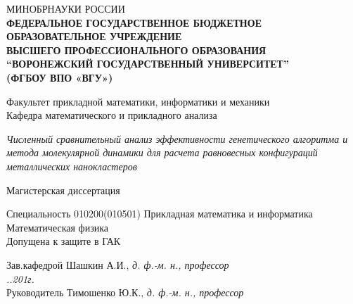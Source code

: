 %
%
\begin{titlepage}

\thispagestyle{empty} %
\begin{center}
 МИНОБРНАУКИ РОССИИ \\
{\bf {\small ФЕДЕРАЛЬНОЕ ГОСУДАРСТВЕННОЕ БЮДЖЕТНОЕ ОБРАЗОВАТЕЛЬНОЕ УЧРЕЖДЕНИЕ \\
ВЫСШЕГО ПРОФЕССИОНАЛЬНОГО ОБРАЗОВАНИЯ} \\
“ВОРОНЕЖСКИЙ ГОСУДАРСТВЕННЫЙ УНИВЕРСИТЕТ”\\
(ФГБОУ ВПО «ВГУ»)}
\end{center}

\vspace{1mm}

\begin{center}
 Факультет прикладной математики, информатики и механики\\
 Кафедра математического и прикладного анализа\\
\end{center}
\vspace{7mm}
\begin{center}
{\it Численный сравнительный анализ эффективности генетического алгоритма и метода молекулярной динамики
     для расчета равновесных конфигураций металлических нанокластеров}
\end{center}
\vspace{8mm}
\begin{center}
{Магистерская диссертация\/}
\end{center}
\vspace{8mm}
\begin{flushleft}
Специальность 010200(010501) Прикладная математика и информатика\\
Математическая физика \\
\vspace{6mm}
Допущена к защите в ГАК
\end{flushleft}
\vspace{1mm}
\begin{flushleft}
Зав.кафедрой \underline{\hspace{30mm}} Шашкин А.И., {\it д. ф.-м. н., профессор}\\
{\it\underline{\hspace{10mm}}.\underline{\hspace{10mm}}.201\underline{\hspace{5mm}}г.}\\
Руководитель \underline{\hspace{30mm}} Тимошенко Ю.К., {\it д. ф.-м. н., профессор}\\

\end{flushleft}
\end{titlepage}
